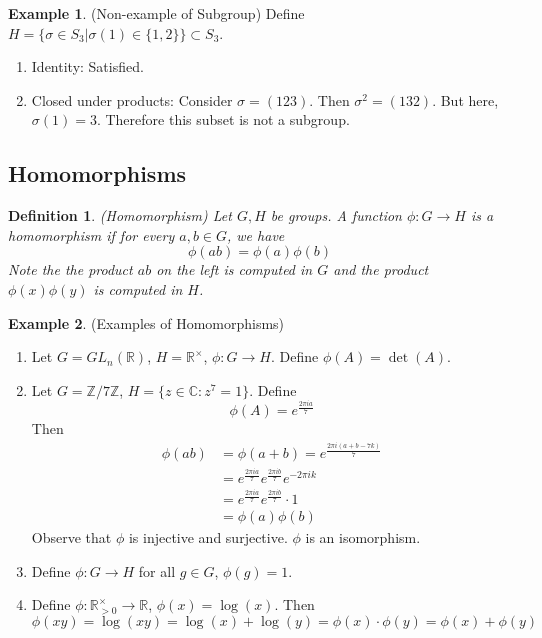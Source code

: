 \documentclass[12pt]{article}
\newtheorem{definition}{Definition}
\theoremstyle{definition}
\newtheorem{example}{Example}
\theoremstyle{definition}
\newcommand{\R}{\mathbb{R}}
\begin{document}
\begin{example}(Non-example of Subgroup)
Define $H = \{ \sigma \in S_3 | \sigma(1) \in \{1, 2 \} \} \subset S_3$. 
\begin{enumerate}
	\item Identity: Satisfied.
	\item Closed under products: Consider $\sigma = (1 2 3)$. Then $\sigma^2 = (1 3 2)$. But here, $\sigma(1) = 3$. Therefore this subset is not a subgroup.
\end{enumerate}	
\end{example}

\subsection{Homomorphisms}
\begin{definition}(Homomorphism)
	Let $G, H$ be groups. A function $\phi : G \to H$ is a homomorphism if for every $a,b \in G$, we have 
	\begin{equation}
		\phi(ab) = \phi(a)\phi(b)
	\end{equation}
	Note the the product $ab$ on the left is computed in $G$ and the product $\phi(x)\phi(y)$ is computed in $H$.
\end{definition}

\begin{example}(Examples of Homomorphisms)
\begin{enumerate}
	\item Let $G = GL_n(\mathbb{R})$, $H = \mathbb{R}^{\times}$, $\phi : G \to H$. Define $\phi(A) = \det(A)$.
	\item Let $G = \mathbb{Z} / 7 \mathbb{Z}$, $H = \{z \in \mathbb{C}: z^7 = 1\}$. Define
	\begin{equation}
		\phi(A) = e^{\frac{2\pi i a}{7}}
	\end{equation}
	Then
	\begin{align*}
		\phi(ab) &= \phi(a + b) = e^{\frac{2\pi i (a + b - 7k)}{7}} \\
		&= e^{\frac{2\pi i a}{7}} e^{\frac{2\pi i b}{7}} e^{-2\pi i k}  \\
		&= e^{\frac{2\pi i a}{7}} e^{\frac{2\pi i b}{7}} \cdot 1 \\
		&= \phi(a)\phi(b)
	\end{align*}
	Observe that $\phi$ is injective and surjective. $\phi$ is an isomorphism.
	\item Define $\phi : G \to H$ for all $g \in G$, $\phi(g) = 1$.
	\item Define $\phi : \R^{\times}_{> 0} \to \R$, $\phi(x) = \log(x)$. Then
	\begin{equation}
		\phi(xy) = \log(xy) = \log(x) + \log(y) = \phi(x) \cdot \phi(y) = \phi(x) + \phi(y)
	\end{equation}
\end{enumerate}
\end{example}
\end{document}
